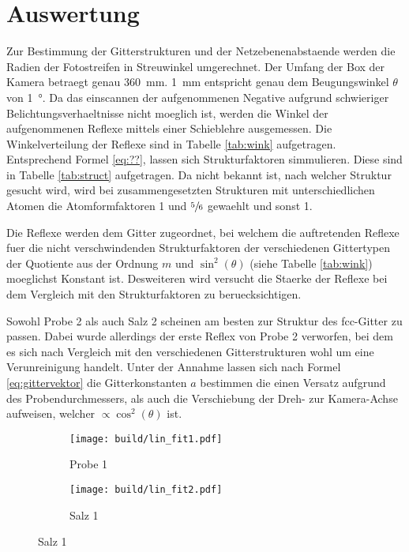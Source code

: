 \section{Auswertung}\label{sec:Auswertung}

Zur Bestimmung der Gitterstrukturen und der Netzebenenabstaende werden die
Radien der Fotostreifen in Streuwinkel umgerechnet. 
Der Umfang der Box der Kamera betraegt genau \SI{360}{\milli\meter}.
\SI{1}{\milli\meter} entspricht genau dem Beugungswinkel $\theta$ von 
\SI{1}{\degree}. 
Da das einscannen der aufgenommenen Negative aufgrund schwieriger
Belichtungsverhaeltnisse nicht moeglich ist, werden die Winkel der aufgenommenen
Reflexe mittels einer Schieblehre ausgemessen. 
Die Winkelverteilung der Reflexe sind in Tabelle \ref{tab:wink} aufgetragen. 
Entsprechend Formel \ref{eq:??}, lassen sich Strukturfaktoren simmulieren. 
Diese sind in Tabelle \ref{tab:struct} aufgetragen. 
Da nicht bekannt ist, nach welcher Struktur gesucht wird, wird bei 
zusammengesetzten Strukturen mit unterschiedlichen Atomen die Atomformfaktoren 
1 und $\sfrac{5}{6}$ gewaehlt und sonst 1. 

Die Reflexe werden dem Gitter zugeordnet, bei welchem die auftretenden Reflexe fuer
die nicht verschwindenden Strukturfaktoren der verschiedenen Gittertypen der 
Quotiente aus der Ordnung $m$ und $\sin^2(\theta)$ (siehe Tabelle \ref{tab:wink})
moeglichst Konstant ist.
Desweiteren wird versucht die Staerke der Reflexe bei dem Vergleich mit den
Strukturfaktoren zu beruecksichtigen. 

Sowohl Probe 2 als auch Salz 2 scheinen am besten zur Struktur des fcc-Gitter zu
passen. 
Dabei wurde allerdings der erste Reflex von Probe 2 verworfen, bei dem es sich 
nach Vergleich mit den verschiedenen Gitterstrukturen wohl um eine Verunreinigung
handelt. 
Unter der Annahme lassen sich nach Formel \ref{eq:gittervektor} die 
Gitterkonstanten $a$ bestimmen die einen Versatz aufgrund des 
Probendurchmessers, als auch die Verschiebung der Dreh- zur Kamera-Achse 
aufweisen, welcher $\propto \cos^2(\theta)$ ist.
\begin{figure}[ht]
		\centering
		\caption{Bestimmung der exakten Gitterkonstanten aus der Abhaengigkeit 
		des	Messfehlers und den naiven Gittervektoren}
		\begin{subfigure}{0.49\textwidth}
				\centering
				\texttt{[image: build/lin\_fit1.pdf]}
				\caption{Probe 1}
				\label{fig:prb1}
		\end{subfigure}
		\begin{subfigure}{0.49\textwidth}
				\centering
				\texttt{[image: build/lin\_fit2.pdf]}
				\caption{Salz 1}
				\label{fig:prb1}
		\end{subfigure}
\end{figure}

